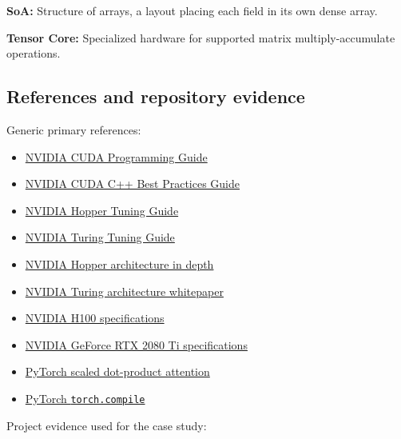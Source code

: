 \documentclass[
  10pt,
  letterpaper,
]{article}
\providecommand{\tightlist}{%
  \setlength{\itemsep}{0pt}\setlength{\parskip}{0pt}}
\begin{document}
\textbf{SoA:} Structure of arrays, a layout placing each field in its
own dense array.

\textbf{Tensor Core:} Specialized hardware for supported matrix
multiply-accumulate operations.

\subsection{References and repository
evidence}\label{references-and-repository-evidence}

Generic primary references:

\begin{itemize}
\tightlist
\item
  \href{https://docs.nvidia.com/cuda/cuda-programming-guide/contents.html}{NVIDIA
  CUDA Programming Guide}
\item
  \href{https://docs.nvidia.com/cuda/cuda-c-best-practices-guide/index.html}{NVIDIA
  CUDA C++ Best Practices Guide}
\item
  \href{https://docs.nvidia.com/cuda/hopper-tuning-guide/index.html}{NVIDIA
  Hopper Tuning Guide}
\item
  \href{https://docs.nvidia.com/cuda/turing-tuning-guide/index.html}{NVIDIA
  Turing Tuning Guide}
\item
  \href{https://developer.nvidia.com/blog/nvidia-hopper-architecture-in-depth/}{NVIDIA
  Hopper architecture in depth}
\item
  \href{https://images.nvidia.com/aem-dam/Solutions/design-visualization/technologies/turing-architecture/NVIDIA-Turing-Architecture-Whitepaper.pdf}{NVIDIA
  Turing architecture whitepaper}
\item
  \href{https://www.nvidia.com/en-us/data-center/h100/}{NVIDIA H100
  specifications}
\item
  \href{https://www.nvidia.com/content/nvidiaGDC/zz/en_ZZ/geforce/graphics-cards/rtx-2080-ti.html}{NVIDIA
  GeForce RTX 2080 Ti specifications}
\item
  \href{https://docs.pytorch.org/docs/stable/generated/torch.nn.functional.scaled_dot_product_attention}{PyTorch
  scaled dot-product attention}
\item
  \href{https://docs.pytorch.org/docs/stable/generated/torch.compile.html}{PyTorch
  \texttt{torch.compile}}
\end{itemize}

Project evidence used for the case study:
\end{document}

